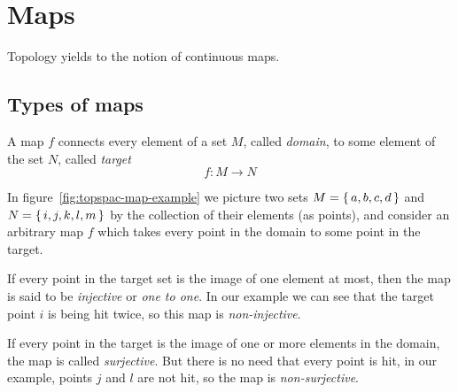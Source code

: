   \section{Maps}
  Topology yields to the notion of continuous maps.
  \subsection{Types of maps}
  A map $f$ connects every element of a set $M$, called \emph{domain}, to some
  element of the set $N$, called \emph{target}
  \[
    f: M \longrightarrow N
  \]

  In figure~\ref{fig:topspac-map-example} we picture two sets
  $M=\set{a, b, c, d}$ and $N=\set{i, j, k, l, m}$ by the collection of their
  elements (as points), and consider an arbitrary map $f$ which takes every
  point in the domain to some point in the target.
  
  If every point in the target set is the image of one element at most, then
  the map is said to be \emph{injective} or \emph{one to one}. In our example
  we can see that the target point $i$ is being hit twice, so this map is
  \emph{non-injective}.

  If every point in the target is the image of one or more elements in the
  domain, the map is called \emph{surjective}. But there is no need that every
  point is hit, in our example, points $j$ and $l$ are not hit, so the map is
  \emph{non-surjective}.

